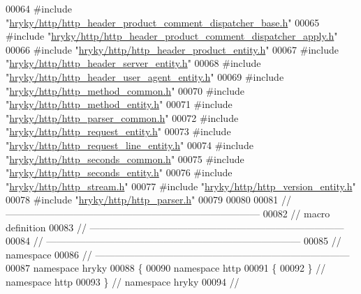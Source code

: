 \begin{DoxyCode}
00064 \textcolor{preprocessor}{#include "\hyperlink{http__header__product__comment__dispatcher__base_8h}{hryky/http/http_header_product_comment_dispatcher_base.h}"}
00065 \textcolor{preprocessor}{#include "\hyperlink{http__header__product__comment__dispatcher__apply_8h}{hryky/http/http_header_product_comment_dispatcher_apply.h}"}
00066 \textcolor{preprocessor}{#include "\hyperlink{http__header__product__entity_8h}{hryky/http/http_header_product_entity.h}"}
00067 \textcolor{preprocessor}{#include "\hyperlink{http__header__server__entity_8h}{hryky/http/http_header_server_entity.h}"}
00068 \textcolor{preprocessor}{#include "\hyperlink{http__header__user__agent__entity_8h}{hryky/http/http_header_user_agent_entity.h}"}
00069 \textcolor{preprocessor}{#include "\hyperlink{http__method__common_8h}{hryky/http/http_method_common.h}"}
00070 \textcolor{preprocessor}{#include "\hyperlink{http__method__entity_8h}{hryky/http/http_method_entity.h}"}
00071 \textcolor{preprocessor}{#include "\hyperlink{http__parser__common_8h}{hryky/http/http_parser_common.h}"}
00072 \textcolor{preprocessor}{#include "\hyperlink{http__request__entity_8h}{hryky/http/http_request_entity.h}"}
00073 \textcolor{preprocessor}{#include "\hyperlink{http__request__line__entity_8h}{hryky/http/http_request_line_entity.h}"}
00074 \textcolor{preprocessor}{#include "\hyperlink{http__seconds__common_8h}{hryky/http/http_seconds_common.h}"}
00075 \textcolor{preprocessor}{#include "\hyperlink{http__seconds__entity_8h}{hryky/http/http_seconds_entity.h}"}
00076 \textcolor{preprocessor}{#include "\hyperlink{http__stream_8h}{hryky/http/http_stream.h}"}
00077 \textcolor{preprocessor}{#include "\hyperlink{http__version__entity_8h}{hryky/http/http_version_entity.h}"}
00078 \textcolor{preprocessor}{#include "\hyperlink{http__parser_8h}{hryky/http/http_parser.h}"}
00079 
00080 
00081 \textcolor{comment}{//
      ------------------------------------------------------------------------------}
00082 \textcolor{comment}{// macro definition}
00083 \textcolor{comment}{//
      ------------------------------------------------------------------------------}
00084 \textcolor{comment}{//
      ------------------------------------------------------------------------------}
00085 \textcolor{comment}{// namespace}
00086 \textcolor{comment}{//
      ------------------------------------------------------------------------------}
00087 \textcolor{keyword}{namespace }hryky
00088 \{
00090 \textcolor{keyword}{namespace }http
00091 \{
00092 \} \textcolor{comment}{// namespace http}
00093 \} \textcolor{comment}{// namespace hryky}
00094 \textcolor{comment}{//
}
\end{DoxyCode}
